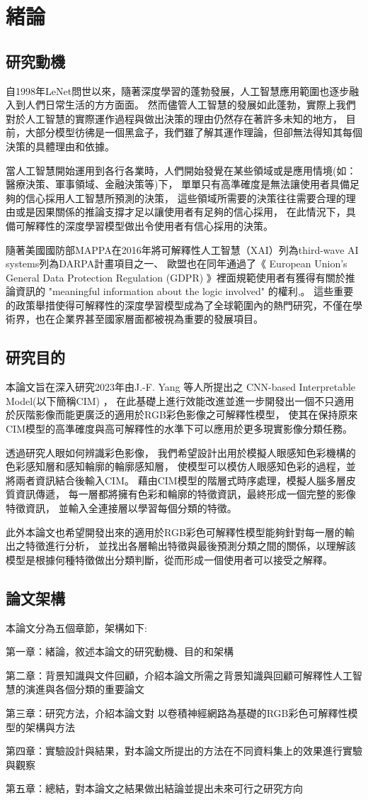 \documentclass[class=NCU_thesis, crop=false]{standalone}
\begin{document}
\chapter{緒論}
\section{研究動機}

自1998年LeNet\cite{726791}問世以來，隨著深度學習的蓬勃發展，人工智慧應用範圍也逐步融入到人們日常生活的方方面面。
然而儘管人工智慧的發展如此蓬勃，實際上我們對於人工智慧的實際運作過程與做出決策的理由仍然存在著許多未知的地方，
目前，大部分模型彷彿是一個黑盒子，我們雖了解其運作理論，但卻無法得知其每個決策的具體理由和依據。

當人工智慧開始運用到各行各業時，人們開始發覺在某些領域或是應用情境(如：醫療決策、軍事領域、金融決策等)下，
單單只有高準確度是無法讓使用者具備足夠的信心採用人工智慧所預測的決策，
這些領域所需要的決策往往需要合理的理由或是因果關係的推論支撐才足以讓使用者有足夠的信心採用，
在此情況下，具備可解釋性的深度學習模型做出令使用者有信心採用的決策。

隨著美國國防部MAPPA在2016年將可解釋性人工智慧（XAI）列為third-wave AI systems列為DARPA計畫項目之一\cite{DARPA}、
歐盟也在同年通過了《 European Union's General Data Protection Regulation (GDPR) 》裡面規範使用者有獲得有關於推論資訊的 "meaningful information about the logic involved" 的權利\cite{GDPR2016a},\cite{doi:10.1080/13600834.2019.1573501}。 這些重要的政策舉措使得可解釋性的深度學習模型成為了全球範圍內的熱門研究，不僅在學術界，也在企業界甚至國家層面都被視為重要的發展項目。

\pagebreak
\section{研究目的}
本論文旨在深入研究2023年由J.-F. Yang 等人所提出之 CNN-based Interpretable Model(以下簡稱CIM) \cite{YangCNNInterpretable}，
在此基礎上進行效能改進並進一步開發出一個不只適用於灰階影像而能更廣泛的適用於RGB彩色影像之可解釋性模型，
使其在保持原來CIM模型的高準確度與高可解釋性的水準下可以應用於更多現實影像分類任務。

透過研究人眼如何辨識彩色影像，
我們希望設計出用於模擬人眼感知色彩機構的色彩感知層和感知輪廓的輪廓感知層，
使模型可以模仿人眼感知色彩的過程，並將兩者資訊結合後輸入CIM。
藉由CIM模型的階層式時序處理，模擬人腦多層皮質資訊傳遞，
每一層都將擁有色彩和輪廓的特徵資訊，最終形成一個完整的影像特徵資訊，
並輸入全連接層以學習每個分類的特徵。

此外本論文也希望開發出來的適用於RGB彩色可解釋性模型能夠針對每一層的輸出之特徵進行分析，
並找出各層輸出特徵與最後預測分類之間的關係，以理解該模型是根據何種特徵做出分類判斷，從而形成一個使用者可以接受之解釋。


\pagebreak
\section{論文架構}

本論文分為五個章節，架構如下:

第一章：緒論，敘述本論文的研究動機、目的和架構

第二章：背景知識與文件回顧，介紹本論文所需之背景知識與回顧可解釋性人工智慧的演進與各個分類的重要論文

第三章：研究方法，介紹本論文對 以卷積神經網路為基礎的RGB彩色可解釋性模型的架構與方法

第四章：實驗設計與結果，對本論文所提出的方法在不同資料集上的效果進行實驗與觀察

第五章：總結，對本論文之結果做出結論並提出未來可行之研究方向
\end{document}
